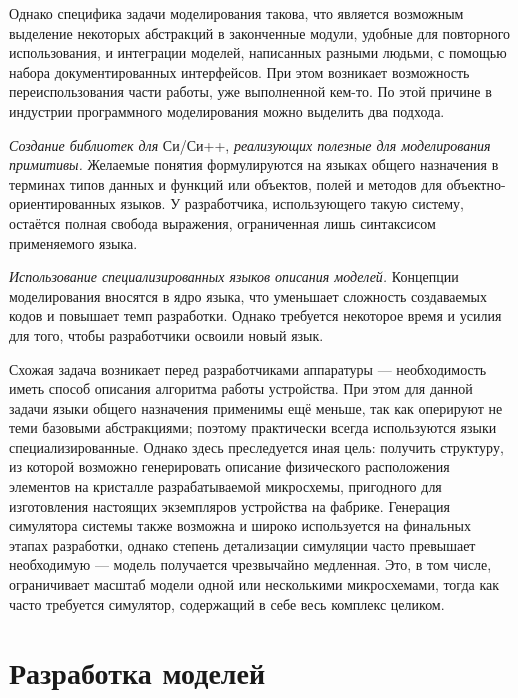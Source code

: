 Однако специфика задачи моделирования такова, что является возможным выделение некоторых абстракций в законченные модули, удобные для повторного использования, и интеграции моделей, написанных разными людьми, с помощью набора документированных интерфейсов. При этом возникает возможность переиспользования части работы, уже выполненной кем-то. По этой причине в индустрии программного моделирования можно выделить два подхода.

\begin{enumerate*}
\item \textit{Создание библиотек для} Си/Си++, \textit{реализующих полезные для  моделирования примитивы.} Желаемые понятия формулируются на языках общего назначения в терминах типов данных и функций или объектов, полей и методов для объектно-ориентированных языков. У разработчика, использующего такую систему, остаётся полная свобода выражения, ограниченная лишь синтаксисом применяемого языка.

\item \textit{Использование специализированных языков описания моделей.} Концепции моделирования вносятся в ядро языка, что уменьшает сложность создаваемых кодов и повышает темп разработки. Однако требуется некоторое время и усилия для того, чтобы разработчики освоили новый язык.
\end{enumerate*}

Схожая задача возникает перед разработчиками аппаратуры --- необходимость иметь способ описания алгоритма работы устройства. При этом для данной задачи языки общего назначения применимы ещё меньше, так как оперируют не теми базовыми абстракциями; поэтому практически всегда используются языки специализированные. Однако здесь преследуется иная цель: получить структуру, из которой возможно генерировать описание физического расположения элементов на кристалле разрабатываемой микросхемы, пригодного для изготовления настоящих экземпляров устройства на фабрике. Генерация симулятора системы также возможна и широко используется на финальных этапах разработки, однако степень детализации симуляции часто превышает необходимую ---  модель получается чрезвычайно медленная. Это, в том числе, ограничивает масштаб модели одной или несколькими микросхемами, тогда как часто требуется симулятор, содержащий в себе весь комплекс целиком.

\section{Разработка моделей}


